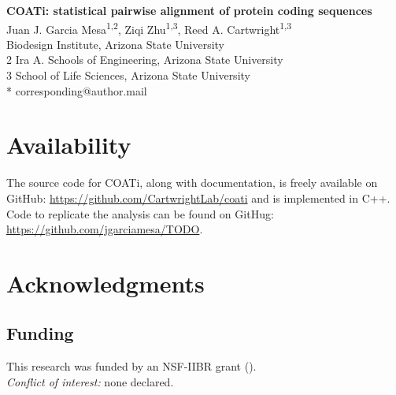 



\begin{flushleft}
{\Large\textbf{COATi: statistical pairwise alignment of protein coding sequences}}
\newline
\\
Juan J. Garcia Mesa\textsuperscript{1,2},
Ziqi Zhu\textsuperscript{1,3},
Reed A. Cartwright\textsuperscript{1,3}
\\
 Biodesign Institute, Arizona State University
\\
2 Ira A. Schools of Engineering, Arizona State University
\\
3 School of Life Sciences, Arizona State University
\\
\bigskip
* corresponding@author.mail

\end{flushleft}



\linenumbers







\section*{Availability}
The source code for COATi, along with documentation, is
freely available on GitHub: \url{https://github.com/CartwrightLab/coati} and is
implemented in C++.
Code to replicate the analysis can be found on GitHug: \url{https://github.com/jgarciamesa/TODO}.


\section*{Acknowledgments}


\subsection*{Funding}
This research was funded by an NSF-IIBR grant ().\\

\noindent \textit{Conflict of interest:} none declared.

\printbibliography

\nolinenumbers


